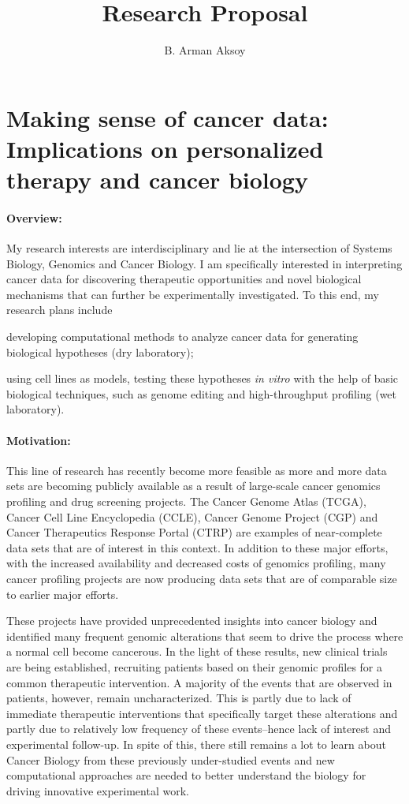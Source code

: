 \documentclass[11pt,letterpaper]{article}
\title{Research Proposal}
\author{B. Arman Aksoy}
\date{}
\begin{document}
\maketitle

\section*{Making sense of cancer data: Implications on personalized therapy and cancer biology}
\paragraph{Overview:}
My research interests are interdisciplinary and lie at the intersection of Systems Biology, Genomics and Cancer Biology.
I am specifically interested in interpreting cancer data for discovering therapeutic opportunities and novel biological mechanisms that can further be experimentally investigated.
To this end, my research plans include
\begin{inparaenum}[(i)]
 \item developing computational methods to analyze cancer data for generating biological hypotheses (dry laboratory);
 \item using cell lines as models, testing these hypotheses \textit{in vitro} with the help of basic biological techniques, such as genome editing and high-throughput profiling (wet laboratory).
\end{inparaenum}

\paragraph{Motivation:}
This line of research has recently become more feasible as more and more data sets are becoming publicly available as a result of large-scale cancer genomics profiling and drug screening projects. 
The Cancer Genome Atlas (TCGA), Cancer Cell Line Encyclopedia (CCLE), Cancer Genome Project (CGP) and Cancer Therapeutics Response Portal (CTRP) are examples of near-complete data sets that are of interest in this context.
In addition to these major efforts, with the increased availability and decreased costs of genomics profiling, many cancer profiling projects are now producing data sets that are of comparable size to earlier major efforts.

These projects have provided unprecedented insights into cancer biology
and identified many frequent genomic alterations that seem to drive the process where a normal cell become cancerous.
In the light of these results, new clinical trials are being established, recruiting patients based on their genomic profiles for a common therapeutic intervention.
A majority of the events that are observed in patients, however, remain uncharacterized.
This is partly due to lack of immediate therapeutic interventions that specifically target these alterations 
and partly due to relatively low frequency of these events--hence lack of interest and experimental follow-up.
In spite of this, there still remains a lot to learn about Cancer Biology from these previously under-studied events
and new computational approaches are needed to better understand the biology for driving innovative experimental work.
\end{document}
